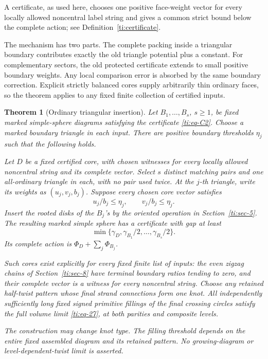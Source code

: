 \documentclass[11pt]{article}
\numberwithin{equation}{section}
\newtheorem{theorem}{Theorem}[section]
\theoremstyle{definition}\newtheorem{definition}[theorem]{Definition}
\theoremstyle{remark}\newtheorem{remark}[theorem]{Remark}
\begin{document}
A certificate, as used here, chooses one positive face-weight vector
for every locally allowed noncentral label string and gives a common
strict bound below the complete action; see Definition~\ref{ti:certificate}.

The mechanism has two parts. The complete packing inside a triangular boundary contributes exactly the old triangle potential plus a constant. For complementary sectors, the old protected certificate extends to small positive boundary weights. Any local comparison error is absorbed by the same boundary correction. Explicit strictly balanced cores supply arbitrarily thin ordinary faces, so the theorem applies to any fixed finite collection of certified inputs.

\begin{theorem}[Ordinary triangular insertion]\label{ti:main} Let \(B_1,\ldots,B_s\), \(s\ge1\), be fixed marked simple-sphere diagrams satisfying the certificate \eqref{ti:eq-C2}. Choose a marked boundary triangle in each input. There are positive boundary thresholds \(\eta_j\) such that the following holds.

Let \(D\) be a fixed certified core, with chosen witnesses for every locally allowed noncentral string and its complete vector. Select \(s\) distinct matching pairs and one all-ordinary triangle in each, with no pair used twice. At the \(j\)-th triangle, write its weights as \((u_j,v_j,b_j)\). Suppose every chosen core vector satisfies
\begin{equation}\label{ti:eq-T1}
u_j/b_j\le\eta_j,\qquad v_j/b_j\le\eta_j.
\end{equation}
Insert the rooted disks of the \(B_j\)'s by the oriented operation in Section~\ref{ti:sec-5}. The resulting marked simple sphere has a certificate with gap at least
\begin{equation}\label{ti:eq-T2}
\min\{\gamma_D,\gamma_{B_1}/2,\ldots,\gamma_{B_s}/2\}.
\end{equation}
Its complete action is \(\Phi_D+\sum_j\Phi_{B_j}\).

Such cores exist explicitly for every fixed finite list of inputs: the even zigzag chains of Section~\ref{ti:sec-8} have terminal boundary ratios tending to zero, and their complete vector is a witness for every noncentral string. Choose any retained half-twist pattern whose final strand connections form one knot. All independently sufficiently long fixed signed primitive fillings of the final crossing circles satisfy the full volume limit \eqref{ti:eq-27}, at both parities and composite levels.

The construction may change knot type. The filling threshold depends on the entire fixed assembled diagram and its retained pattern. No growing-diagram or level-dependent-twist limit is asserted.
\end{theorem}
\end{document}

